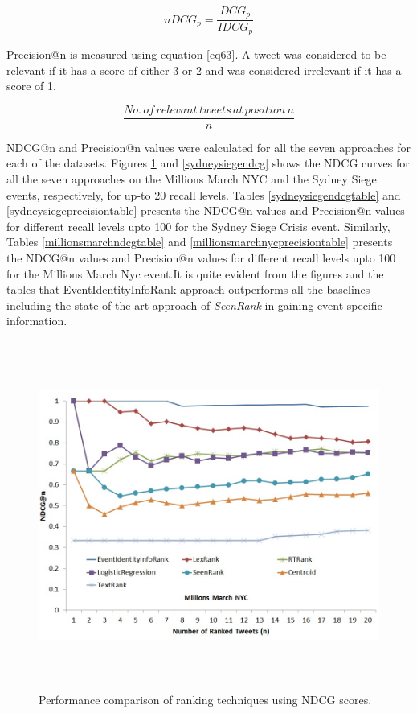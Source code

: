 \begin{equation}
\label{eq62}
nDCG_{p} = \frac{DCG_{p}}{IDCG_{p}} 
\end{equation}

Precision@n is measured using equation \ref{eq63}. A tweet was considered to be relevant if it has a score of either 3 or 2 and was considered irrelevant if it has a score of 1.

\begin{equation}
\label{eq63}
\frac{No.\,of\, relevant\, tweets\, at\, position\, n}{n}
\end{equation}

NDCG@n and Precision@n values were calculated for all the seven approaches for each of the datasets. Figures \ref{millionsmarchndcg} and \ref{sydneysiegendcg} shows the NDCG curves for all the seven approaches on the Millions March NYC and the Sydney Siege events, respectively, for up-to 20 recall levels. Tables \ref{sydneysiegendcgtable} and \ref{sydneysiegeprecisiontable} presents the NDCG@n values and Precision@n values for different recall levels upto 100 for the Sydney Siege Crisis event. Similarly, Tables \ref{millionsmarchndcgtable} and \ref{millionsmarchnycprecisiontable} presents the NDCG@n values and Precision@n values for different recall levels upto 100 for the Millions March Nyc event.It is quite evident from the figures and the tables that EventIdentityInfoRank approach outperforms all the baselines including the state-of-the-art approach of \textit{SeenRank} in gaining event-specific information.



\begin{figure}[htbp]
\centering
\includegraphics[height=4.5in,width=6in]{Figures/EventIdentityInfoRankPerformanceMillionsMarchNyc.jpg}
\caption{Performance comparison of ranking techniques using NDCG scores.}
\label{millionsmarchndcg}
\end{figure}

